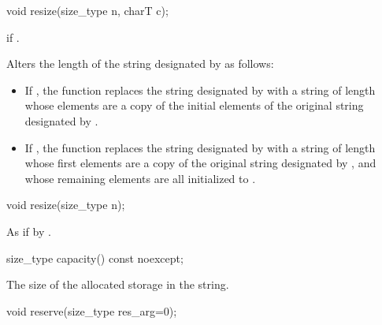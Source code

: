 %
\begin{itemdecl}
void resize(size_type n, charT c);
\end{itemdecl}

\begin{itemdescr}
\pnum
\throws
{}
if
.

\pnum
\effects
Alters the length of the string designated by
as follows:

\begin{itemize}
\item
If
,
the function replaces the string designated by
with a string of length  whose elements are a
copy of the initial elements of the original string designated by
.
\item
If
,
the function replaces the string designated by
with a string of length  whose first
elements are a copy of the original string designated by
,
and whose remaining elements are all initialized to .
\end{itemize}
\end{itemdescr}

%
\begin{itemdecl}
void resize(size_type n);
\end{itemdecl}

\begin{itemdescr}
\pnum
\effects
As if by .
\end{itemdescr}

%
\begin{itemdecl}
size_type capacity() const noexcept;
\end{itemdecl}

\begin{itemdescr}
\pnum
\returns
The size of the allocated storage in the string.
\end{itemdescr}

%
\begin{itemdecl}
void reserve(size_type res_arg=0);
\end{itemdecl}


